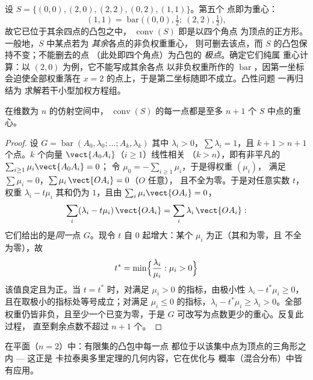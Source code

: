 \begin{example}\label{ex:b2:affine:squarehull}
设 $S = \{(0,0), (2,0), (2,2), (0,2), (1,1)\}$。第五个
点即为重心：
\[
(1,1) = \operatorname{bar}\bigl((0,0), \tfrac12;\ (2,2),
\tfrac12\bigr),
\]
故它已位于其余四点的凸包之中，
$\operatorname{conv}(S)$ 即是以四个角点
为顶点的正方形。一般地，$S$ 中某点若为
\emph{其余}各点的非负权重重心，
则可删去该点，而 $S$ 的凸包保持不变；不能删去的点
（此处即四个角点）为凸包的
\emph{极点}。确定它们纯属
重心计算：以 $(2,0)$ 为例，它不能写成其余各点
以非负权重所作的 $\operatorname{bar}$，因第一坐标
会迫使全部权重落在
$x = 2$ 的点上，于是第二坐标随即不成立。凸性问题
一再归结为
求解若干小型加权方程组。
\end{example}

\begin{theorem}[卡拉泰奥多里]\label{thm:b2:affine:caratheodory}
在维数为 $n$ 的仿射空间中，
$\operatorname{conv}(S)$ 的每一点都是至多 $n + 1$ 个
$S$ 中点的重心。
\end{theorem}

\begin{proof}
设 $G = \operatorname{bar}(A_0, \lambda_0; \dots; A_k, \lambda_k)$
其中 $\lambda_i > 0$，$\sum\lambda_i = 1$，且 $k + 1 > n + 1$
个点。$k$ 个向量 $\vect{A_0A_i}$（$i \geq 1$）线性相关
（$k > n$），即有非平凡的 $\sum_{i\geq1}\mu_i \vect{A_0A_i} = 0$；
令 $\mu_0 = -\sum_{i\geq1}\mu_i$，于是得权重 $(\mu_i)$，
满足 $\sum\mu_i = 0$，$\sum \mu_i\,\vect{OA_i} = 0$（$O$ 任意），
且不全为零。于是对任意实数 $t$，权重 $\lambda_i - t\mu_i$
其和仍为 $1$，且由 $\sum_i\mu_i\vect{OA_i} = 0$，
\[
\sum_i(\lambda_i - t\mu_i)\,\vect{OA_i}
= \sum_i\lambda_i\,\vect{OA_i} :
\]
它们给出的是\emph{同一}点 $G$。现令 $t$ 自
$0$ 起增大：某个 $\mu_i$ 为正（其和为零，且
不全为零），故
\[
t^* = \min\Bigl\{\frac{\lambda_i}{\mu_i} : \mu_i > 0\Bigr\}
\]
该值良定且为正。当 $t = t^*$ 时，对满足
$\mu_i > 0$ 的指标，由极小性 $\lambda_i - t^*\mu_i \geq 0$，
且在取极小的指标处等号成立；对满足 $\mu_i
\leq 0$ 的指标，$\lambda_i - t^*\mu_i \geq \lambda_i > 0$。全部
权重仍皆非负，且至少一个已变为零，于是 $G$
可改写为点数更少的重心。反复此过程，
直至剩余点数不超过 $n + 1$ 个。
\end{proof}

\begin{example}
在平面（$n = 2$）中：有限集的凸包中每一点
都位于以该集中点为顶点的三角形之内 --- 这正是
卡拉泰奥多里定理的几何内容，它在优化与
概率（混合分布）中皆有应用。
\end{example}

